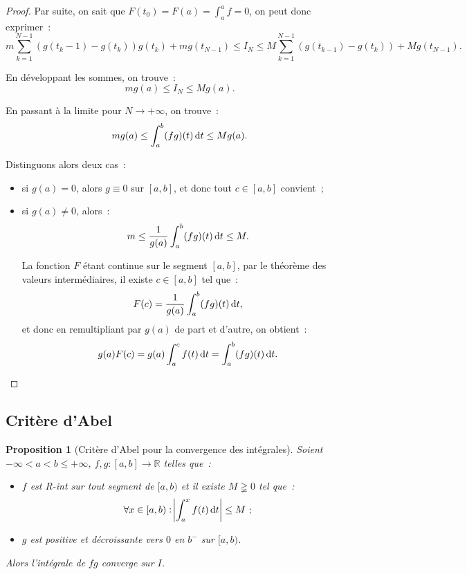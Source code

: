\documentclass{report}
\newtheorem{prp}[thm]{Proposition}
\theoremstyle{definition}
\theoremstyle{remark}
\numberwithin{equation}{section}
\newcommand{\R}{\mathbb R}
\newcommand{\minfty}{{-\infty}}
\newcommand{\pinfty}{{+\infty}}
\begin{document}
\begin{proof}
			Par suite, on sait que $F(t_0) = F(a) = \int_a^a f = 0$, on peut donc exprimer~:
			\begin{equation}
				m\sum_{k=1}^{N-1}\left(g(t_k-1)-g(t_k)\right)g(t_k) + mg(t_{N-1}) \leq I_N \leq M\sum_{k=1}^{N-1}\left(g(t_{k-1}) - g(t_k)\right) + Mg(t_{N-1}).
			\end{equation}

			En développant les sommes, on trouve~:
			\begin{equation}
				mg(a) \leq I_N \leq Mg(a).
			\end{equation}

			En passant à la limite pour $N \to \pinfty$, on trouve~:
			\begin{equation}
				mg(a) \leq \int_a^b(fg)(t)\dif t \leq Mg(a).
			\end{equation}

			Distinguons alors deux cas~:
			\begin{itemize}
				\item si $g(a) = 0$, alors $g \equiv 0$ sur $[a, b]$, et donc tout $c \in [a, b]$ convient~;
				\item si $g(a) \neq 0$, alors~:
				\begin{equation}
					m \leq \frac 1{g(a)}\int_a^b(fg)(t)\dif t \leq M.
				\end{equation}

				La fonction $F$ étant continue sur le segment $[a, b]$, par le théorème des valeurs intermédiaires, il existe $c \in [a, b]$ tel que~:
				\begin{equation}
					F(c) = \frac 1{g(a)}\int_a^b(fg)(t)\dif t,
				\end{equation}
				et donc en remultipliant par $g(a)$ de part et d'autre, on obtient~:
				\begin{equation}
					g(a)F(c) = g(a)\int_a^cf(t)\dif t = \int_a^b(fg)(t)\dif t.
				\end{equation}
			\end{itemize}
			\end{proof}

		\subsection{Critère d'Abel}
			\begin{prp}[Critère d'Abel pour la convergence des intégrales] Soient $\minfty < a < b \leq \pinfty$, $f, g : [a, b] \to \R$ telles que~:
			\begin{itemize}
				\item $f$ est R-int sur tout segment de $[a, b)$ et il existe $M \gneqq 0$ tel que~:
				\begin{equation}
					\forall x \in [a, b) : \abs {\int_a^x f(t)\dif t} \leq M~;
				\end{equation}
				\item $g$ est positive et décroissante vers $0$ en $b^-$ sur $[a, b)$.
			\end{itemize}

			Alors l'intégrale de $fg$ converge sur $I$.
			\end{prp}
\end{document}
